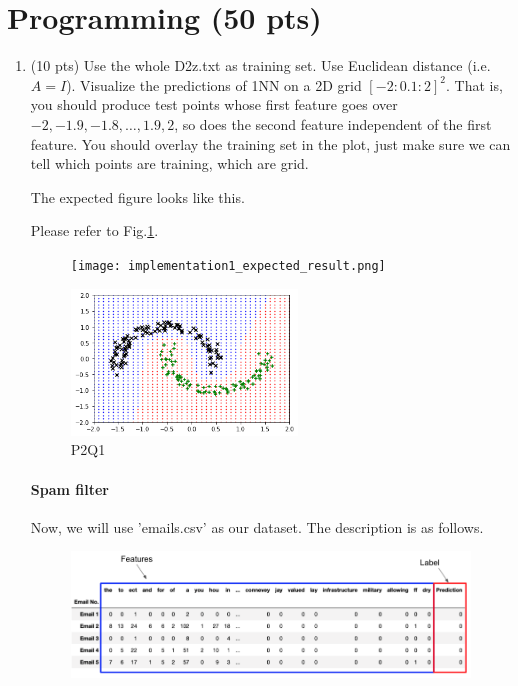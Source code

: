 \documentclass[a4paper]{article}
\theoremstyle{definition}
\newenvironment{soln}{
    \leavevmode\color{blue}\ignorespaces
}{}
\begin{document}
\section{Programming (50 pts)}
\begin{enumerate}
	\item (10 pts) Use the whole D2z.txt as training set.  Use Euclidean distance (i.e. $A=I$).
	Visualize the predictions of 1NN on a 2D grid $[-2:0.1:2]^2$.
	That is, you should produce test points whose first feature goes over $-2, -1.9, -1.8, \ldots, 1.9, 2$, so does the second feature independent of the first feature.
	You should overlay the training set in the plot, just make sure we can tell which points are training, which are grid.
	
	The expected figure looks like this.

 \begin{soln}
Please refer to Fig.\ref{Q1}.
 \end{soln}
	\begin{figure}[h]
		\centering
		\texttt{[image: implementation1\_expected\_result.png]}
	\end{figure}

 	\begin{figure}[h]
		\centering
		\includegraphics[width=6cm]{Q1.png}
        \caption{P2Q1}
        \label{Q1}
	\end{figure}
 
	\paragraph{Spam filter} Now, we will use 'emails.csv' as our dataset. The description is as follows.
	\begin{figure}[h]
		\centering
		\includegraphics[width=\linewidth]{email_head.png}
	\end{figure}
	

\end{enumerate}
\end{document}
